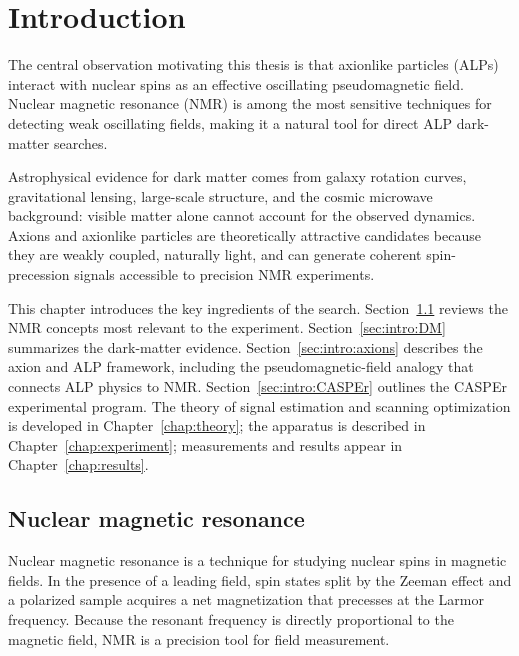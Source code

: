 \chapter{Introduction}\label{chap:introduction}

The central observation motivating this thesis is that axionlike particles (ALPs) interact with nuclear spins as an effective oscillating pseudomagnetic field.
Nuclear magnetic resonance (NMR) is among the most sensitive techniques for detecting weak oscillating fields, making it a natural tool for direct ALP dark-matter searches.

Astrophysical evidence for dark matter comes from galaxy rotation curves, gravitational lensing, large-scale structure, and the cosmic microwave background: visible matter alone cannot account for the observed dynamics.
Axions and axionlike particles are theoretically attractive candidates because they are weakly coupled, naturally light, and can generate coherent spin-precession signals accessible to precision NMR experiments.

This chapter introduces the key ingredients of the search.
Section~\ref{sec:NMR} reviews the NMR concepts most relevant to the experiment.
Section~\ref{sec:intro:DM} summarizes the dark-matter evidence.
Section~\ref{sec:intro:axions} describes the axion and ALP framework, including the pseudomagnetic-field analogy that connects ALP physics to NMR.
Section~\ref{sec:intro:CASPEr} outlines the CASPEr experimental program.
The theory of signal estimation and scanning optimization is developed in Chapter~\ref{chap:theory}; the apparatus is described in Chapter~\ref{chap:experiment}; measurements and results appear in Chapter~\ref{chap:results}.

\section{Nuclear magnetic resonance}\label{sec:NMR}
Nuclear magnetic resonance is a technique for studying nuclear spins in magnetic fields.
In the presence of a leading field, spin states split by the Zeeman effect and a polarized sample acquires a net magnetization that precesses at the Larmor frequency.
Because the resonant frequency is directly proportional to the magnetic field, NMR is a precision tool for field measurement.


